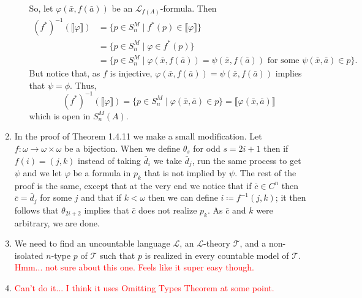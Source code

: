 \documentclass{article}
\theoremstyle{theorem}
\begin{document}
\begin{enumerate}[leftmargin=*]
\begin{enumerate}
			So, let $\varphi(\bar{x},f(\bar{a}))$ be an $\mathcal{L}_{f(A)}$-formula. Then
			\begin{align*}
				(f^*)^{-1}(\llbracket \varphi\rrbracket) &= \{p\in S_n^M \mid f^*(p)\in \llbracket \varphi\rrbracket\}\\
				&= \{p\in S_n^M \mid \varphi\in f^*(p)\}\\
				&= \{p\in S_n^M \mid \varphi(\bar{x},f(\bar{a}))= \psi(\bar{x}, f(\bar{a})) \text{ for some }\psi(\bar{x},\bar{a})\in p\}.
			\end{align*}
			But notice that, as $f$ is injective, $\varphi(\bar{x},f(\bar{a}))= \psi(\bar{x}, f(\bar{a}))$ implies that $\psi = \phi$. Thus,
			\[
				(f^*)^{-1}(\llbracket \varphi\rrbracket) = \{p\in S_n^M \mid \varphi(\bar{x},\bar{a})\in p\} = \llbracket \varphi(\bar{x},\bar{a})\rrbracket
			\] 
			which is open in $S_n^M(A)$.
		\end{enumerate}
		\item In the proof of Theorem 1.4.11 we make a small modification. Let $f\colon \omega \to \omega \times \omega$ be a bijection. When we define $\theta_s$ for odd $s= 2i + 1$ then if $f(i) = (j,k)$ instead of taking $\bar{d}_i$ we take $\bar{d}_j$, run the same process to get $\psi$ and we let $\varphi$ be a formula in $p_k$ that is not implied by $\psi$. The rest of the proof is the same, except that at the very end we notice that if $\bar{c}\in C^n$ then $\bar{c}= \bar{d}_j$ for some $j$ and that if $k< \omega$ then we can define $i\coloneqq f^{-1}(j,k)$; it then follows that $\theta_{2i+2}$ implies that $\bar{c}$ does not realize $p_k$. As $\bar{c}$ and $k$ were arbitrary, we are done.
		
		\item We need to find an uncountable language $\mathcal{L}$, an $\mathcal{L}$-theory $\mathcal{T}$, and a non-isolated $n$-type $p$ of $\mathcal{T}$ such that $p$ is realized in every countable model of $\mathcal{T}$. \textcolor{red}{Hmm... not sure about this one. Feels like it super easy though.}
		
		\item \textcolor{red}{Can't do it... I think it uses Omitting Types Theorem at some point.}
		

\end{enumerate}
\end{document}
